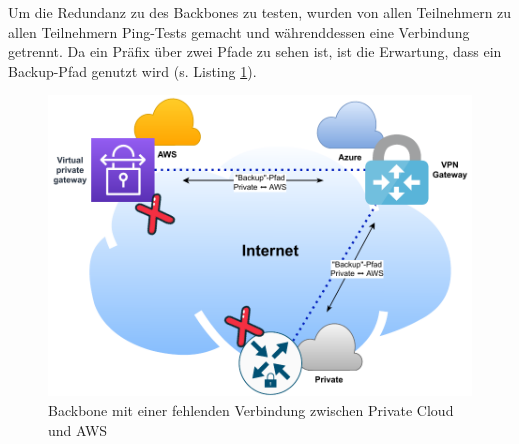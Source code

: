 Um die Redundanz zu des Backbones zu testen, wurden von allen Teilnehmern zu allen Teilnehmern Ping-Tests gemacht und währenddessen eine Verbindung getrennt. Da ein Präfix über zwei Pfade zu sehen ist, ist die Erwartung, dass ein Backup-Pfad genutzt wird (s. Listing \ref{grafik:Use-Case-1_Basis_Deployment_missing_link}).\\

\begin{figure}[h]
  \centering
  \includegraphics{Figures/Use-Case-1_Basis_Deployment_missing_link.pdf}
  \caption{Backbone mit einer fehlenden Verbindung zwischen Private Cloud und AWS}
  \label{grafik:Use-Case-1_Basis_Deployment_missing_link}
\end{figure}\FloatBarrier

